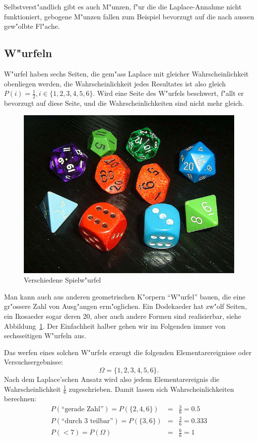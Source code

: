 Selbstverst"andlich gibt es auch M"unzen, f"ur die die Laplace-Annahme
nicht funktioniert, gebogene M"unzen fallen zum Beispiel bevorzugt auf die
nach aussen gew"olbte Fl"ache.

\subsection{W"urfeln}
W"urfel haben sechs Seiten, die gem"ass Laplace mit gleicher
Wahrscheinlichkeit obenliegen werden, die Wahrscheinlichkeit jedes
Resultates ist also gleich $P(i) = \frac12, i\in\{1,2,3,4,5,6\}$.
Wird eine Seite des W"urfels beschwert, f"allt er bevorzugt auf diese
Seite, und die Wahrscheinlichkeiten sind nicht mehr gleich.

\begin{figure}
\begin{center}
\includegraphics[width=0.8\hsize]{graphics/Wuerfel5}
\end{center}
\caption{Verschiedene Spielw"urfel\label{bild-spielwuerfel}}
\end{figure}
Man kann auch aus anderen geometrischen K"orpern ``W"urfel'' bauen, die
eine gr"ossere Zahl von Ausg"angen erm"oglichen. Ein Dodekaeder hat
zw"olf Seiten, ein Ikosaeder sogar deren 20, aber auch andere Formen
sind realisierbar, siehe Abbildung~\ref{bild-spielwuerfel}. Der Einfachheit
halber gehen wir im Folgenden immer von sechsseitigen W"urfeln aus.

Das werfen eines solchen W"urfels erzeugt die folgenden Elementarereignisse
oder Versuchsergebnisse:
\[
\Omega=\{1,2,3,4,5,6\}.
\]
Nach dem Laplace'schen Ansatz wird also jedem Elementarereignis die
Wahrscheinlichkeit $\frac16$ zugeschrieben. Damit lassen sich
Wahrscheinlichkeiten berechnen:
\begin{eqnarray*}
P(\text{``gerade Zahl''})=P(\{2,4,6\})&=&\frac36=0.5\\
P(\text{``durch 3 teilbar''})=P(\{3,6\})&=&\frac26=0.333\\
P(< 7)=P(\Omega)&=&\frac66=1\\
\end{eqnarray*}

